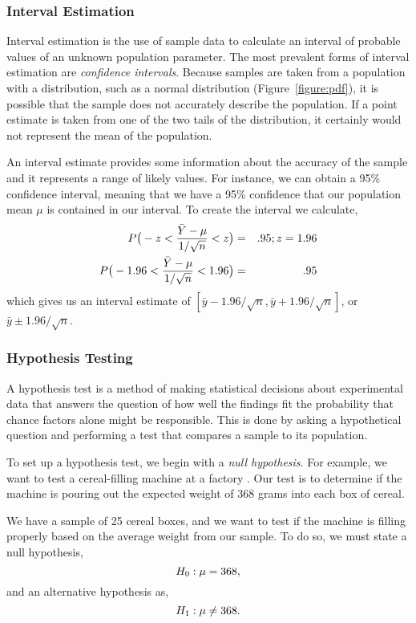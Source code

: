 \subsubsection{Interval Estimation}
Interval estimation is the use of sample data to calculate an interval of probable values of an unknown population parameter. The most prevalent forms of interval estimation are \emph{confidence intervals}. Because samples are taken from a population with a distribution, such as a normal distribution (Figure~\ref{figure:pdf}), it is possible that the sample does not accurately describe the population. If a point estimate is taken from one of the two tails of the distribution, it certainly would not represent the mean of the population.

An interval estimate provides some information about the accuracy of the sample and it represents a range of likely values. For instance, we can obtain a 95\% confidence interval, meaning that we have a 95\% confidence that our population mean $\mu$ is contained in our interval. To create the interval we calculate,
\begin{eqnarray}
P \big(-z< \frac{\bar{Y}-\mu}{1/\sqrt{n}}<z \big)&=&.95 ; z= 1.96 \label{eq:conf-int} \\
P \big(-1.96< \frac{\bar{Y}-\mu}{1/\sqrt{n}}<1.96 \big)&=&.95 \notag
\end{eqnarray}
which gives us an interval estimate of $[\bar{y}-1.96/\sqrt{n},\bar{y}+1.96/\sqrt{n}]$, or $\bar{y} \pm 1.96/\sqrt{n}$.

\subsubsection{Hypothesis Testing}\label{hyp-test}
A hypothesis test is a method of making statistical decisions about experimental data that answers the question of how well the findings fit the probability that chance factors alone might be responsible. This is done by asking a hypothetical question and performing a test that compares a sample to its population.

To set up a hypothesis test, we begin with a \emph{null hypothesis}. For example, we want to test a cereal-filling machine at a factory \cite[pp. 332--358]{levine-2004sme}. Our test is to determine if the machine is pouring out the expected weight of 368 grams into each box of cereal.

We have a sample of 25 cereal boxes, and we want to test if the machine is filling properly based on the average weight from our sample. To do so, we must state a null hypothesis,
\[
H_0 : \mu=368,\index{Null Hypothesis}\index{H0@$H_0$|see{Null Hypothesis}}
\]
and an alternative hypothesis as,
\[
H_1 : \mu \ne 368. \index{Alternative Hypothesis}\index{H1@$H_1$|see{Alternative Hypothesis}}
\]

